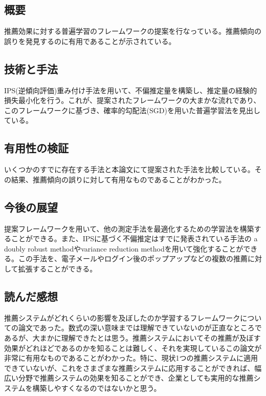 \documentclass{jsarticle}
\begin{document}
\subsection{概要}
推薦効果に対する普遍学習のフレームワークの提案を行なっている。推薦傾向の誤りを発見するのに有用であることが示されている。
\subsection{技術と手法}
IPS(逆傾向評価)重み付け手法を用いて、不偏推定量を構築し、推定量の経験的損失最小化を行う。これが、提案されたフレームワークの大まかな流れであり、このフレームワークに基づき、確率的勾配法(SGD)を用いた普遍学習法を見出している。
\subsection{有用性の検証}
いくつかのすでに存在する手法と本論文にて提案された手法を比較している。その結果、推薦傾向の誤りに対して有用なものであることがわかった。
\subsection{今後の展望}
提案フレームワークを用いて、他の測定手法を最適化するための学習法を構築することができる。また、IPSに基づく不偏推定はすでに発表されている手法の a doubly robust methodやvariance reduction methodを用いて強化することができる。この手法を、電子メールやログイン後のポップアップなどの複数の推薦に対して拡張することができる。
\subsection{読んだ感想}
推薦システムがどれくらいの影響を及ぼしたのか学習するフレームワークについての論文であった。数式の深い意味までは理解できていないのが正直なところであるが、大まかに理解できたとは思う。推薦システムにおいてその推薦が及ぼす効果がどれほどであるのかを知ることは難しく、それを実現しているこの論文が非常に有用なものであることがわかった。特に、現状1つの推薦システムに適用できていないが、これをさまざまな推薦システムに応用することができれば、幅広い分野で推薦システムの効果を知ることができ、企業としても実用的な推薦システムを構築しやすくなるのではないかと思う。
\end{document}
